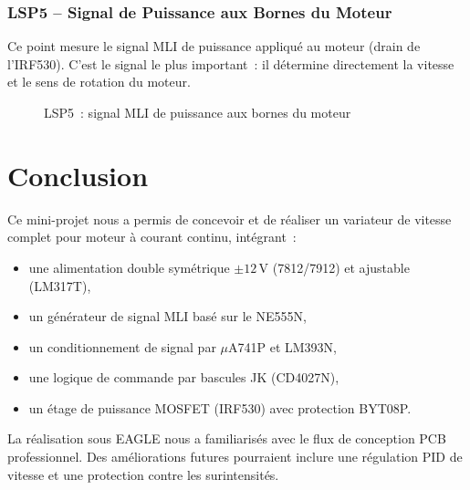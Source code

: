 \documentclass[a4paper,12pt,openany]{book}
\begin{document}
\subsection{LSP5 -- Signal de Puissance aux Bornes du Moteur}

Ce point mesure le signal MLI de puissance appliqu\'e au moteur (drain
de l'IRF530). C'est le signal le plus important~: il d\'etermine
directement la vitesse et le sens de rotation du moteur.

\begin{figure}[H]
  \centering
  \caption{LSP5~: signal MLI de puissance aux bornes du moteur}
  \label{fig:lsp5}
\end{figure}

\chapter*{Conclusion}

Ce mini-projet nous a permis de concevoir et de r\'ealiser un variateur de
vitesse complet pour moteur \`a courant continu, int\'egrant~:
\begin{itemize}
  \item une alimentation double sym\'etrique $\pm12$\,V (7812/7912) et
        ajustable (LM317T),
  \item un g\'en\'erateur de signal MLI bas\'e sur le NE555N,
  \item un conditionnement de signal par $\mu$A741P et LM393N,
  \item une logique de commande par bascules JK (CD4027N),
  \item un \'etage de puissance MOSFET (IRF530) avec protection BYT08P.
\end{itemize}

La r\'ealisation sous EAGLE nous a familiaris\'es avec le flux de conception
PCB professionnel. Des am\'eliorations futures pourraient inclure une
r\'egulation PID de vitesse et une protection contre les surintensit\'es.

\appendix
\end{document}
